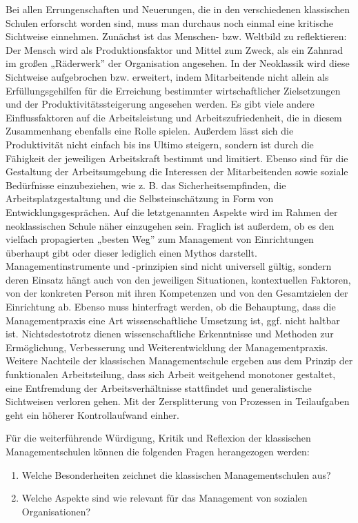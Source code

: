 \documentclass[
  letterpaper,
]{book}
\begin{document}
Bei allen Errungenschaften und Neuerungen, die in den verschiedenen
klassischen Schulen erforscht worden sind, muss man durchaus noch einmal
eine kritische Sichtweise einnehmen. Zunächst ist das Menschen- bzw.
Weltbild zu reflektieren: Der Mensch wird als Produktionsfaktor und
Mittel zum Zweck, als ein Zahnrad im großen „Räderwerk'' der
Organisation angesehen. In der Neoklassik wird diese Sichtweise
aufgebrochen bzw. erweitert, indem Mitarbeitende nicht allein als
Erfüllungsgehilfen für die Erreichung bestimmter wirtschaftlicher
Zielsetzungen und der Produktivitätssteigerung angesehen werden. Es gibt
viele andere Einflussfaktoren auf die Arbeitsleistung und
Arbeitszufriedenheit, die in diesem Zusammenhang ebenfalls eine Rolle
spielen. Außerdem lässt sich die Produktivität nicht einfach bis ins
Ultimo steigern, sondern ist durch die Fähigkeit der jeweiligen
Arbeitskraft bestimmt und limitiert. Ebenso sind für die Gestaltung der
Arbeitsumgebung die Interessen der Mitarbeitenden sowie soziale
Bedürfnisse einzubeziehen, wie z. B. das Sicherheitsempfinden, die
Arbeitsplatzgestaltung und die Selbsteinschätzung in Form von
Entwicklungsgesprächen. Auf die letztgenannten Aspekte wird im Rahmen
der neoklassischen Schule näher einzugehen sein. Fraglich ist außerdem,
ob es den vielfach propagierten „besten Weg'' zum Management von
Einrichtungen überhaupt gibt oder dieser lediglich einen Mythos
darstellt. Managementinstrumente und -prinzipien sind nicht universell
gültig, sondern deren Einsatz hängt auch von den jeweiligen Situationen,
kontextuellen Faktoren, von der konkreten Person mit ihren Kompetenzen
und von den Gesamtzielen der Einrichtung ab. Ebenso muss hinterfragt
werden, ob die Behauptung, dass die Managementpraxis eine Art
wissenschaftliche Umsetzung ist, ggf. nicht haltbar ist.
Nichtsdestotrotz dienen wissenschaftliche Erkenntnisse und Methoden zur
Ermöglichung, Verbesserung und Weiterentwicklung der Managementpraxis.
Weitere Nachteile der klassischen Managementschule ergeben aus dem
Prinzip der funktionalen Arbeitsteilung, dass sich Arbeit weitgehend
monotoner gestaltet, eine Entfremdung der Arbeitsverhältnisse
stattfindet und generalistische Sichtweisen verloren gehen. Mit der
Zersplitterung von Prozessen in Teilaufgaben geht ein höherer
Kontrollaufwand einher.

Für die weiterführende Würdigung, Kritik und Reflexion der klassischen
Managementschulen können die folgenden Fragen herangezogen werden:

\begin{enumerate}
\def\labelenumi{\arabic{enumi}.}
\item
  Welche Besonderheiten zeichnet die klassischen Managementschulen aus?
\item
  Welche Aspekte sind wie relevant für das Management von sozialen
  Organisationen?
\end{enumerate}
\end{document}
